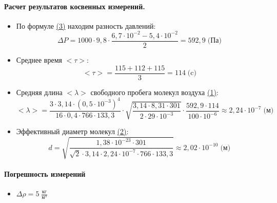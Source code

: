 \documentclass{article}
\begin{document}
\paragraph{Расчет результатов косвенных измерений.}
\begin{itemize}
	\item По формуле \hyperlink{formuls}{(3)} находим разность давлений:
	$$ \Delta P=1000\cdot9,8\cdot\frac{6,7\cdot10^{-2}-5,4\cdot10^{-2}}{2}=592,9\;\mbox{(Па)}$$
	\item Среднее время $<\tau>$:
	$$<\tau>=\frac{115+112+115}{3}=114\;\mbox{(c)}$$
	\item Средняя длина $<\lambda>$ свободного пробега молекул воздуха \hyperlink{formuls}{(1)}:
	$$<\lambda>=\frac{3\cdot3,14\cdot(0,5\cdot10^{-3})^4}{16\cdot0,4\cdot766\cdot133,3}\cdot\sqrt{\frac{3,14\cdot8,31\cdot301}{2\cdot29\cdot10^{-3}}}\cdot\frac{592,9\cdot114}{100\cdot10^{-6}}\approx2,24\cdot10^{-7}\;\mbox{(м)}$$
	\item Эффективный диаметр молекул \hyperlink{formuls}{(2)}:
	$$d=\sqrt{\frac{1,38\cdot10^{-23}\cdot301}{\sqrt{2}\cdot3,14\cdot2,24\cdot10^{-7}\cdot766\cdot133,3}}\approx2,02\cdot10^{-10}\;\mbox{(м)}$$
\end{itemize}

\paragraph{Погрешность измерений}
\begin{itemize}
\item
$\Delta\rho=5\;\frac{\mbox{кг}}{\mbox{м}^3}$

\end{itemize}
\end{document}
